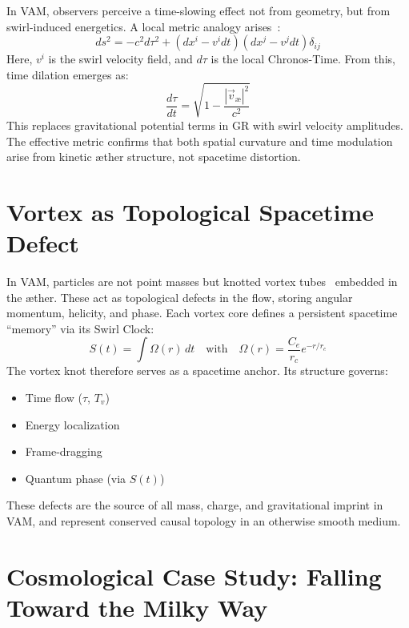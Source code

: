 \documentclass[11pt]{article}
\begin{document}
    In VAM, observers perceive a time-slowing effect not from geometry, but from swirl-induced energetics. A local metric analogy arises~\cite{iskandarani2025vam1}:
    \begin{equation}
        ds^2 = -c^2 d\tau^2 + (dx^i - v^i dt)(dx^j - v^j dt) \delta_{ij}
    \end{equation}
    Here, $v^i$ is the swirl velocity field, and $d\tau$ is the local Chronos-Time. From this, time dilation emerges as:
    \begin{equation}
        \frac{d\tau}{dt} = \sqrt{1 - \frac{|\vec{v}_\text{\ae}|^2}{c^2}}
    \end{equation}
    This replaces gravitational potential terms in GR with swirl velocity amplitudes. The effective metric confirms that both spatial curvature and time modulation arise from kinetic \ae ther structure, not spacetime distortion.

    \section*{Vortex as Topological Spacetime Defect}

    In VAM, particles are not point masses but knotted vortex tubes~\cite{Kleckner2013} embedded in the \ae ther. These act as topological defects in the flow, storing angular momentum, helicity, and phase. Each vortex core defines a persistent spacetime ``memory'' via its Swirl Clock:
    \begin{equation}
        S(t) = \int \Omega(r) \, dt \quad \text{with} \quad \Omega(r) = \frac{C_e}{r_c} e^{-r/r_c}
    \end{equation}
    The vortex knot therefore serves as a spacetime anchor. Its structure governs:
    \begin{itemize}
        \item Time flow ($\tau$, $T_v$)
        \item Energy localization
        \item Frame-dragging
        \item Quantum phase (via $S(t)$)
    \end{itemize}

    These defects are the source of all mass, charge, and gravitational imprint in VAM, and represent conserved causal topology in an otherwise smooth medium.



    \section*{Cosmological Case Study: Falling Toward the Milky Way}
\end{document}
